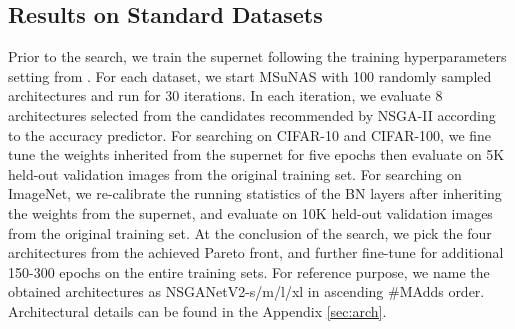 \documentclass[runningheads]{llncs}
\def\ourmethod{MSuNAS}
\def\ourmodel{NSGANetV2}
\begin{document}
\subsection{Results on Standard Datasets}
Prior to the search, we train the supernet following the training hyperparameters setting from \cite{onceforall}. For each dataset, we start \ourmethod{} with 100 randomly sampled architectures and run for 30 iterations. In each iteration, we evaluate 8 architectures selected from the candidates recommended by NSGA-II according to the accuracy predictor. For searching on CIFAR-10 and CIFAR-100, we fine tune the weights inherited from the supernet for five epochs then evaluate on 5K held-out validation images from the original training set. For searching on ImageNet, we re-calibrate the running statistics of the BN layers after inheriting the weights from the supernet, and evaluate on 10K held-out validation images from the original training set. At the conclusion of the search, we pick the four architectures from the achieved Pareto front, and further fine-tune for additional 150-300 epochs on the entire training sets. For reference purpose, we name the obtained architectures as \ourmodel{}-s/m/l/xl in ascending \#MAdds order. Architectural details can be found in the Appendix \ref{sec:arch}.
\end{document}
